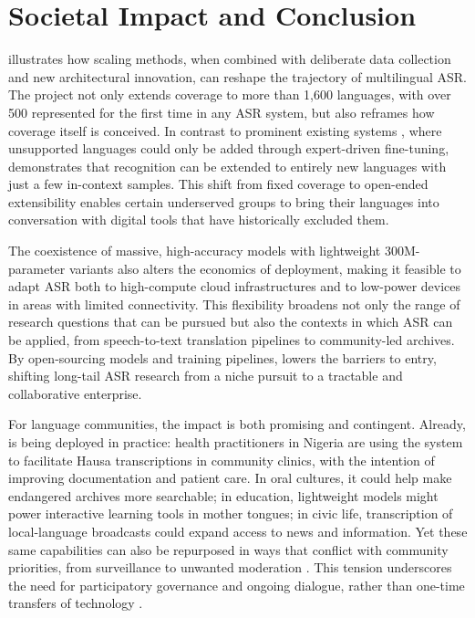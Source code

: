 \documentclass[]{fairmeta}
\begin{document}
\section{Societal Impact and Conclusion}
\label{section:impact}

\OmniASR illustrates how scaling methods, when combined with deliberate data collection and new architectural innovation, can reshape the trajectory of multilingual ASR. The project not only extends coverage to more than 1,600 languages, with over 500 represented for the first time in any ASR system, but also reframes how coverage itself is conceived. In contrast to prominent existing systems \citep{radford2023robust,pratap2024scaling,zhang2023google}, where unsupported languages could only be added through expert-driven fine-tuning, \OmniASR demonstrates that recognition can be extended to entirely new languages with just a few in-context samples. This shift from fixed coverage to open-ended extensibility enables certain underserved groups to bring their languages into conversation with digital tools that have historically excluded them.

The coexistence of massive, high-accuracy models with lightweight 300M-parameter variants also alters the economics of deployment, making it feasible to adapt ASR both to high-compute cloud infrastructures and to low-power devices in areas with limited connectivity. This flexibility broadens not only the range of research questions that can be pursued but also the contexts in which ASR can be applied, from speech-to-text translation pipelines to community-led archives. By open-sourcing models and training pipelines, \OmniASR lowers the barriers to entry, shifting long-tail ASR research from a niche pursuit to a tractable and collaborative enterprise.

For language communities, the impact is both promising and contingent. Already, \OmniASR is being deployed in practice: health practitioners in Nigeria are using the system to facilitate Hausa transcriptions in community clinics, with the intention of improving documentation and patient care. In oral cultures, it could help make endangered archives more searchable; in education, lightweight models might power interactive learning tools in mother tongues; in civic life, transcription of local-language broadcasts could expand access to news and information. Yet these same capabilities can also be repurposed in ways that conflict with community priorities, from surveillance to unwanted moderation \citep{abdullah2021sok}. This tension underscores the need for participatory governance and ongoing dialogue, rather than one-time transfers of technology \citep{wang2024human}.
\end{document}
